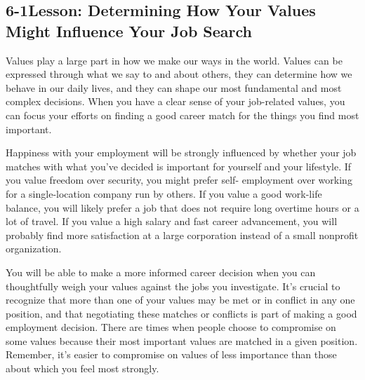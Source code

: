 \pagebreak \subsection*{6-1\quad Lesson: Determining How Your Values Might Influence Your Job Search}
Values play a large part in how we make our ways in the world. Values can be expressed through what we say to and about others, they can determine how we behave in our daily lives, and they can shape our most fundamental and most complex decisions. When you have a clear sense of your job-related values, you can focus your efforts on finding a good career match for the things you find most important.

Happiness with your employment will be strongly influenced by whether your job matches with what you've decided is important for yourself and your lifestyle. If you value freedom over security, you might prefer self- employment over working for a single-location company run by others. If you value a good work-life balance, you will likely prefer a job that does not require long overtime hours or a lot of travel. If you value a high salary and fast career advancement, you will probably find more satisfaction at a large corporation instead of a small nonprofit organization.

You will be able to make a more informed career decision when you can thoughtfully weigh your values against the jobs you investigate. It's crucial to recognize that more than one of your values may be met or in conflict in any one position, and that negotiating these matches or conflicts is part of making a good employment decision. There are times when people choose to compromise on some values because their most important values are matched in a given position. Remember, it's easier to compromise on values of less importance than those about which you feel most strongly.

